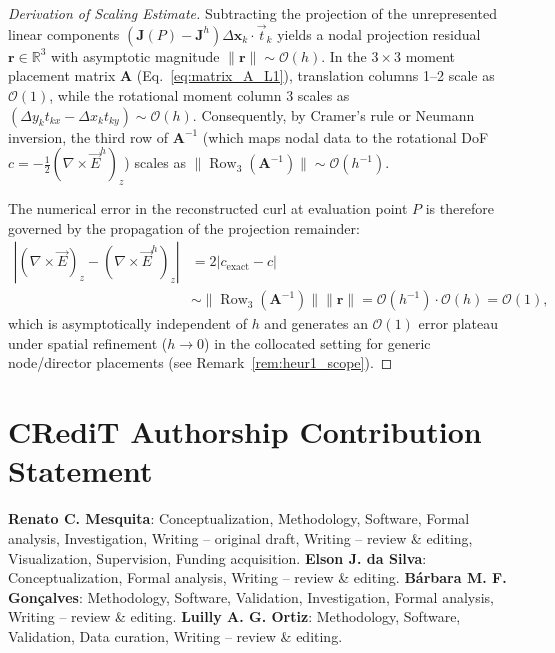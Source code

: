 \documentclass[preprint,12pt]{elsarticle}
\begin{document}
\begin{proof}[Derivation of Scaling Estimate]
    Subtracting the projection of the unrepresented linear components $(\mathbf{J}(P) - \mathbf{J}^h) \Delta\mathbf{x}_k \cdot \vec{t}_k$ yields a nodal projection residual $\mathbf{r} \in \mathbb{R}^3$ with asymptotic magnitude $\|\mathbf{r}\| \sim \mathcal{O}(h)$. In the $3 \times 3$ moment placement matrix $\mathbf{A}$ (Eq.~\eqref{eq:matrix_A_L1}), translation columns 1--2 scale as $\mathcal{O}(1)$, while the rotational moment column 3 scales as $(\Delta y_k t_{kx} - \Delta x_k t_{ky}) \sim \mathcal{O}(h)$. Consequently, by Cramer's rule or Neumann inversion, the third row of $\mathbf{A}^{-1}$ (which maps nodal data to the rotational DoF $c = -\frac{1}{2}(\nabla \times \vec{E}^h)_z$) scales as $\|\operatorname{Row}_3(\mathbf{A}^{-1})\| \sim \mathcal{O}(h^{-1})$.

    The numerical error in the reconstructed curl at evaluation point $P$ is therefore governed by the propagation of the projection remainder:
    \begin{equation}
        \begin{aligned}
            |(\nabla \times \vec{E})_z - (\nabla \times \vec{E}^h)_z| & = 2 |c_{\mathrm{exact}} - c|                                                                                               \\
                                                                      & \sim \|\operatorname{Row}_3(\mathbf{A}^{-1})\| \|\mathbf{r}\| = \mathcal{O}(h^{-1}) \cdot \mathcal{O}(h) = \mathcal{O}(1),
        \end{aligned}
    \end{equation}
    which is asymptotically independent of $h$ and generates an $\mathcal{O}(1)$ error plateau under spatial refinement ($h \to 0$) in the collocated setting for generic node/director placements (see Remark~\ref{rem:heur1_scope}).
\end{proof}


\section*{CRediT Authorship Contribution Statement}
\textbf{Renato C. Mesquita}: Conceptualization, Methodology, Software, Formal analysis, Investigation, Writing -- original draft, Writing -- review \& editing, Visualization, Supervision, Funding acquisition.
\textbf{Elson J. da Silva}: Conceptualization, Formal analysis, Writing -- review \& editing.
\textbf{Bárbara M. F. Gonçalves}: Methodology, Software, Validation, Investigation, Formal analysis, Writing -- review \& editing.
\textbf{Luilly A. G. Ortiz}: Methodology, Software, Validation, Data curation, Writing -- review \& editing.
\end{document}

